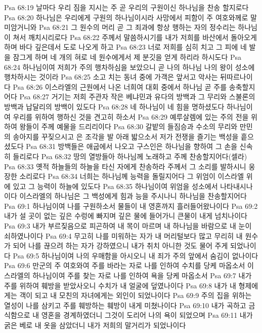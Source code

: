 Psa 68:19  날마다 우리 짐을 지시는 주 곧 우리의 구원이신 하나님을 찬송 할지로다
Psa 68:20  하나님은 우리에게 구원의 하나님이시라 사망에서 피함이 주 여호와께로 말미암거니와
Psa 68:21  그 원수의 머리 곧 그 죄과에 항상 행하는 자의 정수리는 하나님이 쳐서 깨치시리로다
Psa 68:22  주께서 말씀하시기를 내가 저희를 바산에서 돌아오게 하며 바다 깊은데서 도로 나오게 하고
Psa 68:23  너로 저희를 심히 치고 그 피에 네 발을 잠그게 하며 네 개의 혀로 네 원수에게서 제 분깃을 얻게 하리라 하시도다
Psa 68:24  하나님이여 저희가 주의 행차하심을 보았으니 곧 나의 하나님 나의 왕이 성소에 행차하시는 것이라
Psa 68:25  소고 치는 동녀 중에 가객은 앞서고 악사는 뒤따르나이다
Psa 68:26  이스라엘의 근원에서 나온 너희여 대회 중에서 하나님 곧 주를 송축할지어다
Psa 68:27  거기는 저희 주관자 작은 베냐민과 유다의 방백과 그 무리와 스불론의 방백과 납달리의 방백이 있도다
Psa 68:28  네 하나님이 네 힘을 명하셨도다 하나님이여 우리를 위하여 행하신 것을 견고히 하소서
Psa 68:29  예루살렘에 있는 주의 전을 위하여 왕들이 주께 예물을 드리리이다
Psa 68:30  갈밭의 들짐승과 수소의 무리와 만민의 송아지를 꾸짖으시고 은 조각을 발 아래 밟으소서 저가 전쟁을 즐기는 백성을 흩으셨도다
Psa 68:31  방백들은 애굽에서 나오고 구스인은 하나님을 향하여 그 손을 신속히 들리로다
Psa 68:32  땅의 열방들아 하나님께 노래하고 주께 찬송할지어다(셀라)
Psa 68:33  옛적 하늘들의 하늘을 타신 자에게 찬송하라 주께서 그 소리를 발하시니 웅장한 소리로다
Psa 68:34  너희는 하나님께 능력을 돌릴지어다 그 위엄이 이스라엘 위에 있고 그 능력이 하늘에 있도다
Psa 68:35  하나님이여 위엄을 성소에서 나타내시나이다 이스라엘의 하나님은 그 백성에게 힘과 능을 주시나니 하나님을 찬송할지어다
Psa 69:1  하나님이여 나를 구원하소서 물들이 내 영혼까지 흘러들어왔나이다
Psa 69:2  내가 설 곳이 없는 깊은 수렁에 빠지며 깊은 물에 들어가니 큰물이 내게 넘치나이다
Psa 69:3  내가 부르짖음으로 피곤하여 내 목이 마르며 내 하나님을 바람으로 내 눈이 쇠하였나이다
Psa 69:4  무고히 나를 미워하는 자가 내 머리털보다 많고 무리히 내 원수가 되어 나를 끊으려 하는 자가 강하였으니 내가 취치 아니한 것도 물어 주게 되었나이다
Psa 69:5  하나님이여 나의 우매함을 아시오니 내 죄가 주의 앞에서 숨김이 없나이다
Psa 69:6  만군의 주 여호와여 주를 바라는 자로 나를 인하여 수치를 당케 마옵소서 이스라엘의 하나님이여 주를 찾는 자로 나를 인하여 욕을 당케 마옵소서
Psa 69:7  내가 주를 위하여 훼방을 받았사오니 수치가 내 얼굴에 덮였나이다
Psa 69:8  내가 내 형제에게는 객이 되고 내 모친의 자녀에게는 외인이 되었나이다
Psa 69:9  주의 집을 위하는 열성이 나를 삼키고 주를 훼방하는 훼방이 내게 미쳤나이다
Psa 69:10  내가 곡하고 금식함으로 내 영혼을 경계하였더니 그것이 도리어 나의 욕이 되었으며
Psa 69:11  내가 굵은 베로 내 옷을 삼았더니 내가 저희의 말거리가 되었나이다
